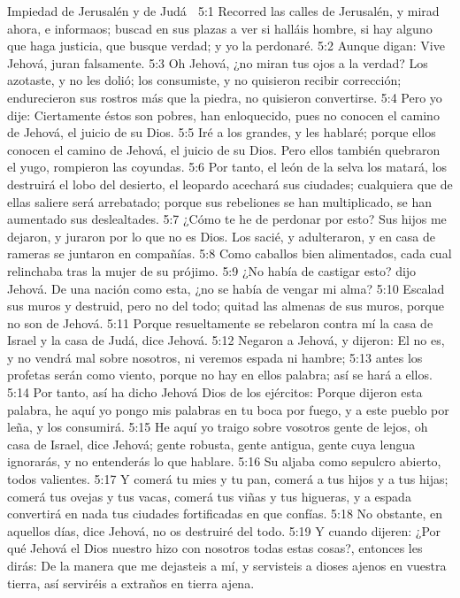Impiedad de Jerusalén y de Judá  

5:1 Recorred las calles de Jerusalén, y mirad ahora, e informaos; buscad en sus plazas a ver si halláis hombre, si hay alguno que haga justicia, que busque verdad; y yo la perdonaré.  
5:2 Aunque digan: Vive Jehová, juran falsamente.  
5:3 Oh Jehová, ¿no miran tus ojos a la verdad? Los azotaste, y no les dolió; los consumiste, y no quisieron recibir corrección; endurecieron sus rostros más que la piedra, no quisieron convertirse.  
5:4 Pero yo dije: Ciertamente éstos son pobres, han enloquecido, pues no conocen el camino de Jehová, el juicio de su Dios.  
5:5 Iré a los grandes, y les hablaré; porque ellos conocen el camino de Jehová, el juicio de su Dios. Pero ellos también quebraron el yugo, rompieron las coyundas.  
5:6 Por tanto, el león de la selva los matará, los destruirá el lobo del desierto, el leopardo acechará sus ciudades; cualquiera que de ellas saliere será arrebatado; porque sus rebeliones se han multiplicado, se han aumentado sus deslealtades.  
5:7 ¿Cómo te he de perdonar por esto? Sus hijos me dejaron, y juraron por lo que no es Dios. Los sacié, y adulteraron, y en casa de rameras se juntaron en compañías.  
5:8 Como caballos bien alimentados, cada cual relinchaba tras la mujer de su prójimo.  
5:9 ¿No había de castigar esto? dijo Jehová. De una nación como esta, ¿no se había de vengar mi alma?  
5:10 Escalad sus muros y destruid, pero no del todo; quitad las almenas de sus muros, porque no son de Jehová.  
5:11 Porque resueltamente se rebelaron contra mí la casa de Israel y la casa de Judá, dice Jehová.  
5:12 Negaron a Jehová, y dijeron: El no es, y no vendrá mal sobre nosotros, ni veremos espada ni hambre;  
5:13 antes los profetas serán como viento, porque no hay en ellos palabra; así se hará a ellos.  
5:14 Por tanto, así ha dicho Jehová Dios de los ejércitos: Porque dijeron esta palabra, he aquí yo pongo mis palabras en tu boca por fuego, y a este pueblo por leña, y los consumirá.  
5:15 He aquí yo traigo sobre vosotros gente de lejos, oh casa de Israel, dice Jehová; gente robusta, gente antigua, gente cuya lengua ignorarás, y no entenderás lo que hablare.  
5:16 Su aljaba como sepulcro abierto, todos valientes.  
5:17 Y comerá tu mies y tu pan, comerá a tus hijos y a tus hijas; comerá tus ovejas y tus vacas, comerá tus viñas y tus higueras, y a espada convertirá en nada tus ciudades fortificadas en que confías.  
5:18 No obstante, en aquellos días, dice Jehová, no os destruiré del todo.  
5:19 Y cuando dijeren: ¿Por qué Jehová el Dios nuestro hizo con nosotros todas estas cosas?, entonces les dirás: De la manera que me dejasteis a mí, y servisteis a dioses ajenos en vuestra tierra, así serviréis a extraños en tierra ajena.  
